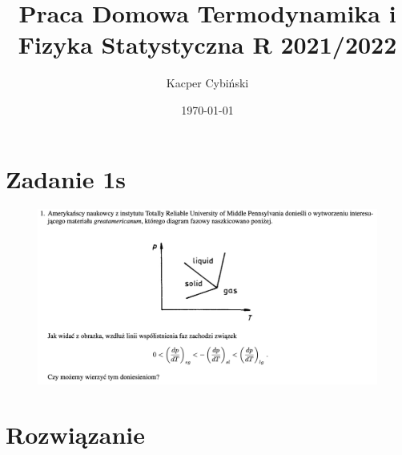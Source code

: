 \documentclass[12pt,a4paper]{article}
\title{Praca Domowa Termodynamika i Fizyka Statystyczna R 2021/2022}
\author{Kacper Cybiński}
\date{\today}
\begin{document}
\maketitle

\section{Zadanie 1s}

\begin{figure}[h!]
    \includegraphics[width=\linewidth]{z1.png}
\end{figure}

\section{Rozwiązanie}
\end{document}
